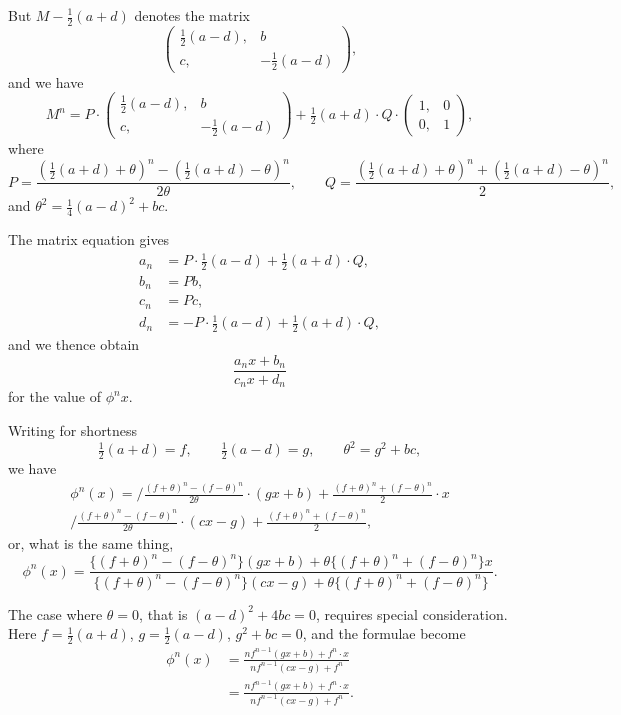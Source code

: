 \documentclass[12pt,a4paper]{article}
\begin{document}
But $M - \tfrac{1}{2}(a+d)$ denotes the matrix
%
\[
\left(\begin{array}{c|c}
\tfrac{1}{2}(a-d), & b \\[4pt]
c, & -\tfrac{1}{2}(a-d)
\end{array}\right),
\]
%
and we have
%
\[
M^n = P \cdot \left(\begin{array}{c|c}
\tfrac{1}{2}(a-d), & b \\[4pt]
c, & -\tfrac{1}{2}(a-d)
\end{array}\right)
+ \tfrac{1}{2}(a+d) \cdot Q \cdot
\left(\begin{array}{c|c} 1, & 0 \\ \hline 0, & 1 \end{array}\right),
\]
%
where
%
\[
P = \frac{(\tfrac{1}{2}(a+d) + \theta)^n - (\tfrac{1}{2}(a+d) - \theta)^n}{2\theta},
\qquad
Q = \frac{(\tfrac{1}{2}(a+d) + \theta)^n + (\tfrac{1}{2}(a+d) - \theta)^n}{2},
\]
%
and $\theta^2 = \tfrac{1}{4}(a-d)^2 + bc$.

The matrix equation gives
\begin{align*}
a_n &= P \cdot \tfrac{1}{2}(a-d) + \tfrac{1}{2}(a+d) \cdot Q, \\
b_n &= Pb, \\
c_n &= Pc, \\
d_n &= -P \cdot \tfrac{1}{2}(a-d) + \tfrac{1}{2}(a+d) \cdot Q,
\end{align*}
%
and we thence obtain
%
\[
\frac{a_n x + b_n}{c_n x + d_n}
\]
%
for the value of $\phi^n x$.

Writing for shortness
%
\[
\tfrac{1}{2}(a+d) = f, \qquad \tfrac{1}{2}(a-d) = g, \qquad \theta^2 = g^2 + bc,
\]
%
we have
%
\begin{multline*}
\phi^n(x) = \bigg/
\frac{(f+\theta)^n - (f-\theta)^n}{2\theta} \cdot (gx+b)
+ \frac{(f+\theta)^n + (f-\theta)^n}{2} \cdot x \\
\bigg/ \frac{(f+\theta)^n - (f-\theta)^n}{2\theta} \cdot (cx-g)
+ \frac{(f+\theta)^n + (f-\theta)^n}{2},
\end{multline*}
%
or, what is the same thing,
%
\[
\phi^n(x) = \frac{\{(f+\theta)^n - (f-\theta)^n\}(gx+b)
+ \theta\{(f+\theta)^n + (f-\theta)^n\}x}
{\{(f+\theta)^n - (f-\theta)^n\}(cx-g)
+ \theta\{(f+\theta)^n + (f-\theta)^n\}}.
\]

The case where $\theta = 0$, that is $(a-d)^2 + 4bc = 0$, requires special consideration.
Here $f = \tfrac{1}{2}(a+d)$, $g = \tfrac{1}{2}(a-d)$, $g^2 + bc = 0$, and the formulae become
%
\begin{align*}
\phi^n(x) &= \frac{nf^{n-1}(gx+b) + f^n \cdot x}{nf^{n-1}(cx-g) + f^n} \\
&= \frac{nf^{n-1}(gx+b) + f^n \cdot x}{nf^{n-1}(cx-g) + f^n}.
\end{align*}
\end{document}
